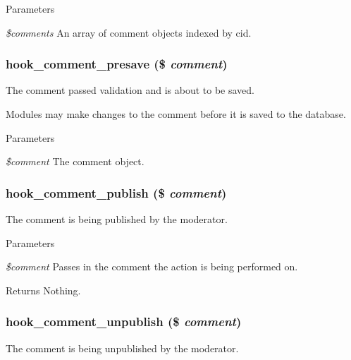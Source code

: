 \begin{DoxyParams}{Parameters}
\item[{\em \$comments}]An array of comment objects indexed by cid. \end{DoxyParams}
\hypertarget{group__hooks_gaaa06736884e98ef79711f70af9d1a266}{
\subsubsection[{hook\_\-comment\_\-presave}]{\setlength{\rightskip}{0pt plus 5cm}hook\_\-comment\_\-presave (\$ {\em comment})}}
\label{group__hooks_gaaa06736884e98ef79711f70af9d1a266}
The comment passed validation and is about to be saved.

Modules may make changes to the comment before it is saved to the database.


\begin{DoxyParams}{Parameters}
\item[{\em \$comment}]The comment object. \end{DoxyParams}
\hypertarget{group__hooks_ga4c4be9019e5cc7f92e8ccc03b595a64b}{
\subsubsection[{hook\_\-comment\_\-publish}]{\setlength{\rightskip}{0pt plus 5cm}hook\_\-comment\_\-publish (\$ {\em comment})}}
\label{group__hooks_ga4c4be9019e5cc7f92e8ccc03b595a64b}
The comment is being published by the moderator.


\begin{DoxyParams}{Parameters}
\item[{\em \$comment}]Passes in the comment the action is being performed on. \end{DoxyParams}
\begin{DoxyReturn}{Returns}
Nothing. 
\end{DoxyReturn}
\hypertarget{group__hooks_gaed97e1a1eaedd7b482f881ea2b8a3876}{
\subsubsection[{hook\_\-comment\_\-unpublish}]{\setlength{\rightskip}{0pt plus 5cm}hook\_\-comment\_\-unpublish (\$ {\em comment})}}
\label{group__hooks_gaed97e1a1eaedd7b482f881ea2b8a3876}
The comment is being unpublished by the moderator.


